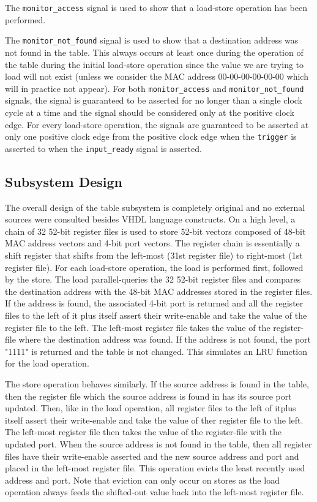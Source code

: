 \documentclass{article}
\begin{document}
The \texttt{monitor\_access} signal is used to show that a load-store operation has been performed. 

The \texttt{monitor\_not\_found} signal is used to show that a destination address was not found in the table. This always occurs at least once during the operation of the table during the initial load-store operation since the value we are trying to load will not exist (unless we consider the MAC address 00-00-00-00-00-00 which will in practice not appear). For both \texttt{monitor\_access} and \texttt{monitor\_not\_found} signals, the signal is guaranteed to be asserted for no longer than a single clock cycle at a time and the signal should be considered only at the positive clock edge. For every load-store operation, the signals are guaranteed to be asserted at only one positive clock edge from the positive clock edge when the \texttt{trigger} is asserted to when the \texttt{input\_ready} signal is asserted.

\subsection{Subsystem Design}

The overall design of the table subsystem is completely original and no external sources were consulted besides VHDL language constructs. On a high level, a chain of 32 52-bit register files is used to store 52-bit vectors composed of 48-bit MAC address vectors and 4-bit port vectors. The register chain is essentially a shift register that shifts from the left-most (31st register file) to right-most (1st register file). For each load-store operation, the load is performed first, followed by the store. The load parallel-queries the 32 52-bit register files and compares the destination address with the 48-bit MAC addresses stored in the register files. If the address is found, the associated 4-bit port is returned and all the register files to the left of it plus itself assert their write-enable and take the value of the register file to the left. The left-most register file takes the value of the register-file where the destination address was found. If the address is not found, the port "1111" is returned and the table is not changed. This simulates an LRU function for the load operation. 

The store operation behaves similarly. If the source address is found in the table, then the register file which the source address is found in has its source port updated. Then, like in the load operation, all register files to the left of itplus itself assert their write-enable and take the value of ther register file to the left. The left-most register file then takes the value of the register-file with the updated port. When the source address is not found in the table, then all register files have their write-enable asserted and the new source address and port and placed in the left-most register file. This operation evicts the least recently used address and port. Note that eviction can only occur on stores as the load operation always feeds the shifted-out value back into the left-most register file.
\end{document}
